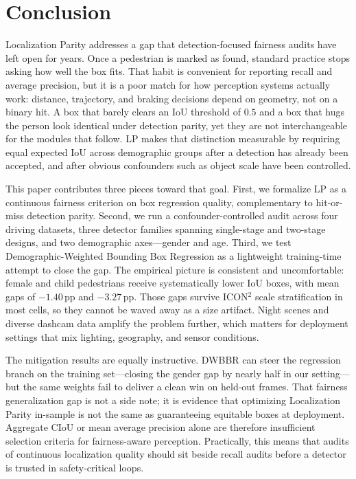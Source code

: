 \documentclass[runningheads]{llncs}
\begin{document}
\section{Conclusion}
\label{sec:conclusion}

Localization Parity addresses a gap that detection-focused fairness audits have
left open for years. Once a pedestrian is marked as found, standard practice
stops asking how well the box fits. That habit is convenient for reporting
recall and average precision, but it is a poor match for how perception systems
actually work: distance, trajectory, and braking decisions depend on geometry,
not on a binary hit. A box that barely clears an IoU threshold of $0.5$ and a
box that hugs the person look identical under detection parity, yet they are not
interchangeable for the modules that follow. LP makes that distinction
measurable by requiring equal expected IoU across demographic groups after a
detection has already been accepted, and after obvious confounders such as
object scale have been controlled.

This paper contributes three pieces toward that goal. First, we formalize LP as
a continuous fairness criterion on box regression quality, complementary to
hit-or-miss detection parity. Second, we run a confounder-controlled audit
across four driving datasets, three detector families spanning single-stage and
two-stage designs, and two demographic axes---gender and age. Third, we test
Demographic-Weighted Bounding Box Regression as a lightweight training-time
attempt to close the gap. The empirical picture is consistent and uncomfortable:
female and child pedestrians receive systematically lower IoU boxes, with mean
gaps of $-1.40$\,pp and $-3.27$\,pp. Those gaps survive ICON$^2$ scale
stratification in most cells, so they cannot be waved away as a size artifact.
Night scenes and diverse dashcam data amplify the problem further, which
matters for deployment settings that mix lighting, geography, and sensor
conditions.

The mitigation results are equally instructive. DWBBR can steer the regression
branch on the training set---closing the gender gap by nearly half in our
setting---but the same weights fail to deliver a clean win on held-out frames.
That fairness generalization gap is not a side note; it is evidence that
optimizing Localization Parity in-sample is not the same as guaranteeing
equitable boxes at deployment. Aggregate CIoU or mean average precision alone
are therefore insufficient selection criteria for fairness-aware perception.
Practically, this means that audits of continuous localization quality should
sit beside recall audits before a detector is trusted in safety-critical loops.
\end{document}
